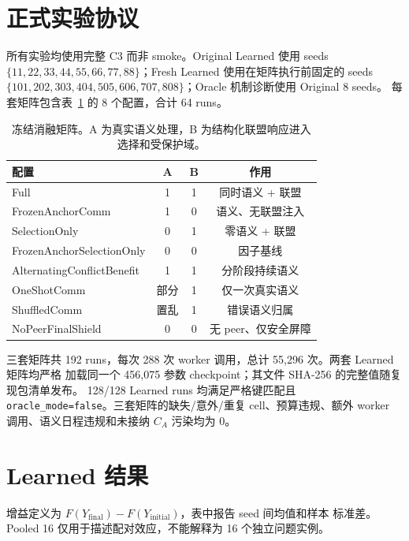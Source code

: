 \section{正式实验协议}

所有实验均使用完整 C3 而非 smoke。Original Learned 使用 seeds
$\{11,22,33,44,55,66,77,88\}$；Fresh Learned 使用在矩阵执行前固定的 seeds
$\{101,202,303,404,505,606,707,808\}$；Oracle 机制诊断使用 Original 8 seeds。
每套矩阵包含表~\ref{tab:methods} 的 8 个配置，合计 64 runs。

\begin{table}[t]
\caption{冻结消融矩阵。A 为真实语义处理，B 为结构化联盟响应进入选择和受保护域。}
\label{tab:methods}
\small
\begin{tabular}{lccc}
\toprule
配置 & A & B & 作用 \\
\midrule
Full & 1 & 1 & 同时语义 + 联盟 \\
FrozenAnchorComm & 1 & 0 & 语义、无联盟注入 \\
SelectionOnly & 0 & 1 & 零语义 + 联盟 \\
FrozenAnchorSelectionOnly & 0 & 0 & 因子基线 \\
AlternatingConflictBenefit & 1 & 1 & 分阶段持续语义 \\
OneShotComm & 部分 & 1 & 仅一次真实语义 \\
ShuffledComm & 置乱 & 1 & 错误语义归属 \\
NoPeerFinalShield & 0 & 0 & 无 peer、仅安全屏障 \\
\bottomrule
\end{tabular}
\end{table}

三套矩阵共 192 runs，每次 288 次 worker 调用，总计 55,296 次。两套 Learned 矩阵均严格
加载同一个 456,075 参数 checkpoint；其文件 SHA-256 的完整值随复现包清单发布。
128/128 Learned runs 均满足严格键匹配且 \texttt{oracle\_mode=false}。三套矩阵的缺失/意外/重复
cell、预算违规、额外 worker 调用、语义日程违规和未接纳 $C_A$ 污染均为 0。

\section{Learned 结果}

增益定义为 $F(Y_{\mathrm{final}})-F(Y_{\mathrm{initial}})$，表中报告 seed 间均值和样本
标准差。Pooled 16 仅用于描述配对效应，不能解释为 16 个独立问题实例。

